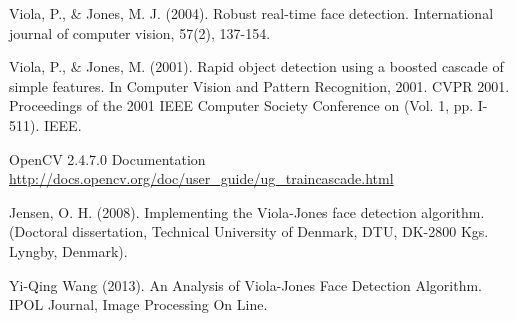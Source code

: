\documentclass[11pt,spanish,a4paper]{article} %
\begin{document}
\begin{thebibliography}{99} %

Viola, P., \& Jones, M. J. (2004). 
\newblock Robust real-time face detection. 
\newblock International journal of computer vision, 57(2), 137-154.

Viola, P., \& Jones, M. (2001). 
\newblock Rapid object detection using a boosted cascade of simple features. 
\newblock In Computer Vision and Pattern Recognition, 2001. CVPR 2001. Proceedings of the 2001 IEEE Computer Society Conference on (Vol. 1, pp. I-511). IEEE.

OpenCV 2.4.7.0 Documentation
\newblock \url{http://docs.opencv.org/doc/user\_guide/ug\_traincascade.html}

Jensen, O. H. (2008). 
\newblock Implementing the Viola-Jones face detection algorithm.
\newblock (Doctoral dissertation, Technical University of Denmark, DTU, DK-2800 Kgs. Lyngby, Denmark).

Yi-Qing Wang (2013).
\newblock An Analysis of Viola-Jones Face Detection Algorithm.
\newblock IPOL Journal, Image Processing On Line.

\end{thebibliography}

\end{document}

